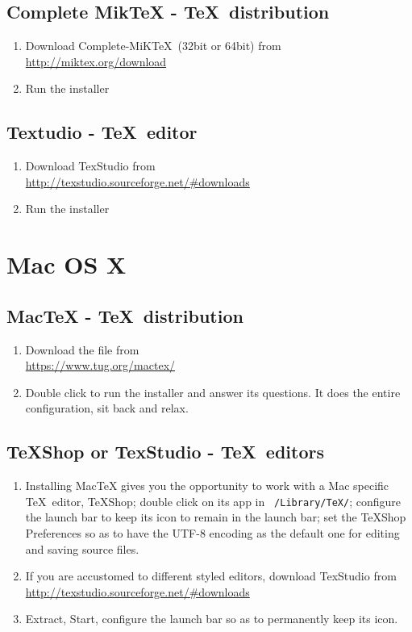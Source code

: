 \subsection*{Complete MikTeX - \TeX~distribution}
\begin{enumerate}
\item	Download Complete-MiK\TeX\ (32bit or 64bit) from\\
\href{http://miktex.org/download}{http://miktex.org/download}
\item	Run the installer 
\end{enumerate}

\subsection*{Textudio - \TeX~editor}
\begin{enumerate}
\item	Download TexStudio from\\
\href{http://texstudio.sourceforge.net/\#downloads}
{http://texstudio.sourceforge.net/\#downloads} 
\item	Run the installer
\end{enumerate}
\section*{Mac OS X}
\subsection*{MacTeX - \TeX~distribution}
\begin{enumerate}
\item	Download the file from\\
\href{https://www.tug.org/mactex/}{https://www.tug.org/mactex/}
\item	Double click to run the installer and answer its questions. It does the entire configuration, sit back and relax.
\end{enumerate}

\subsection*{TeXShop or TexStudio - \TeX~editors}
\begin{enumerate}
\item Installing MacTeX gives you the opportunity to work with a Mac specific \TeX~editor, TeXShop; double click on its app in \texttt{\string~/Library/TeX/}; configure the launch bar to keep its icon to remain in the launch bar; set the TeXShop Preferences so as to have the UTF-8 encoding as the default one for editing and saving source files.
\item	If you are accustomed to different styled editors, download TexStudio from\\
\href{http://texstudio.sourceforge.net/\#downloads}
{http://texstudio.sourceforge.net/\#downloads} 
\item	Extract, Start, configure the launch bar so as to permanently keep its icon. 
\end{enumerate}

